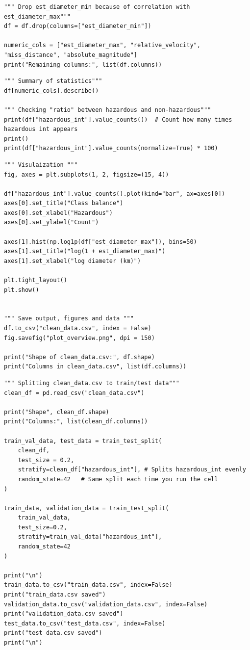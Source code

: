 \documentclass{article}
\begin{document}
\begin{lstlisting}
""" Drop est_diameter_min because of correlation with est_diameter_max"""
df = df.drop(columns=["est_diameter_min"])

numeric_cols = ["est_diameter_max", "relative_velocity", "miss_distance", "absolute_magnitude"]
print("Remaining columns:", list(df.columns))

\end{lstlisting}



\begin{lstlisting}
""" Summary of statistics"""
df[numeric_cols].describe()

""" Checking "ratio" between hazardous and non-hazardous"""
print(df["hazardous_int"].value_counts())  # Count how many times hazardous int appears
print()
print(df["hazardous_int"].value_counts(normalize=True) * 100)
\end{lstlisting}


\begin{lstlisting}
""" Visulaization """
fig, axes = plt.subplots(1, 2, figsize=(15, 4))

df["hazardous_int"].value_counts().plot(kind="bar", ax=axes[0])
axes[0].set_title("Class balance")
axes[0].set_xlabel("Hazardous")
axes[0].set_ylabel("Count")

axes[1].hist(np.log1p(df["est_diameter_max"]), bins=50)
axes[1].set_title("log(1 + est_diameter_max)")
axes[1].set_xlabel("log diameter (km)")

plt.tight_layout()
plt.show()


""" Save output, figures and data """
df.to_csv("clean_data.csv", index = False)
fig.savefig("plot_overview.png", dpi = 150)

print("Shape of clean_data.csv:", df.shape)
print("Columns in clean_data.csv", list(df.columns))
\end{lstlisting}


\begin{lstlisting}
""" Splitting clean_data.csv to train/test data"""
clean_df = pd.read_csv("clean_data.csv")

print("Shape", clean_df.shape)
print("Columns:", list(clean_df.columns))

train_val_data, test_data = train_test_split(
    clean_df,
    test_size = 0.2,
    stratify=clean_df["hazardous_int"], # Splits hazardous_int evenly
    random_state=42   # Same split each time you run the cell
)

train_data, validation_data = train_test_split(
    train_val_data,
    test_size=0.2,
    stratify=train_val_data["hazardous_int"],
    random_state=42
)

print("\n")
train_data.to_csv("train_data.csv", index=False)
print("train_data.csv saved")
validation_data.to_csv("validation_data.csv", index=False)
print("validation_data.csv saved")
test_data.to_csv("test_data.csv", index=False)
print("test_data.csv saved")
print("\n")

\end{lstlisting}
\end{document}
